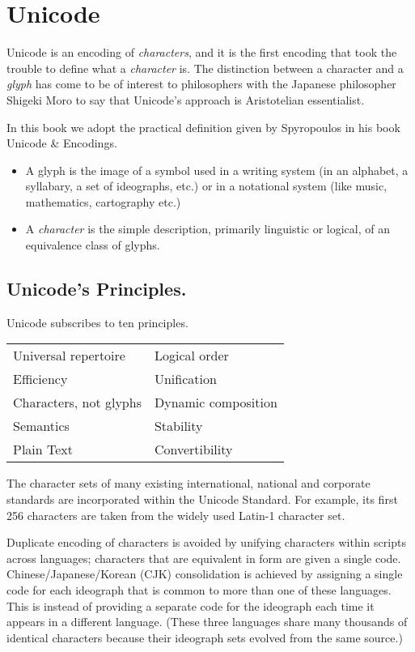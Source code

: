 \chapter{Unicode}

Unicode is an encoding of \textit{characters}, and it is the first encoding that took the trouble to define what a
\textit{character} is. The distinction between a character and a \textit{glyph} has come to be of interest to philosophers with the Japanese philosopher Shigeki Moro to say that Unicode’s approach is Aristotelian essentialist. 

In this book we adopt the practical definition given by Spyropoulos in his book Unicode \& Encodings. 

\begin{itemize}

\item A glyph is the image of a symbol used in a writing system (in an alphabet, a syllabary, a set of ideographs, etc.) or in a notational system (like music, mathematics, cartography etc.)

\item A \textit{character} is the simple description, primarily linguistic or logical, of an equivalence class of glyphs.
\end{itemize}

\section{Unicode's Principles.}

Unicode subscribes to ten principles.

\medskip
\begin{tabular}{ll}
Universal repertoire &Logical order\\
Efficiency &Unification\\
Characters, not glyphs &Dynamic composition\\
Semantics &Stability\\
Plain Text &Convertibility\\
\end{tabular}
\medskip


The character sets of many existing international, national and corporate standards are incorporated within the Unicode Standard. For example, its first 256 characters are taken from the widely used Latin-1 character set.

Duplicate encoding of characters is avoided by unifying characters within scripts across languages; characters that are equivalent in form are given a single code. Chinese/Japanese/Korean (CJK) consolidation is achieved by assigning a single code for each ideograph that is common to more than one of these languages. This is instead of providing a separate code for the ideograph each time it appears in a different language. (These three languages share many thousands of identical characters because their ideograph sets evolved from the same source.)

